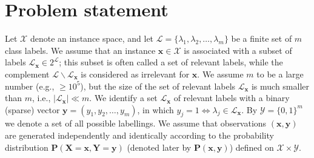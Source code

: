 \documentclass{article}
\renewcommand{\vec}[1]{\boldsymbol{#1}}
\newcommand{\bx}{\vec{x}}
\newcommand{\by}{\vec{y}}
\newcommand{\bX}{\vec{X}}
\newcommand{\bY}{\vec{Y}}
\newcommand{\calX}{\mathcal{X}}
\newcommand{\calY}{\mathcal{Y}}
\newcommand{\calL}{\mathcal{L}}
\newcommand{\prob}{\mathbf{P}}
\newcommand{\sectionBefore}{-0pt}
\newcommand{\sectionAfter}{-0pt}
\begin{document}
{%
%

\vspace{\sectionBefore}
\section{Problem statement}
\label{sec:problem_statement}
\vspace{\sectionAfter}

Let $\calX$ denote an instance space, and let $\calL = \{\lambda_1,\lambda_2, \ldots,\lambda_m\}$ be a finite set of $m$ class labels. 
We assume that an instance $\bx \in \calX$ is associated with a subset of
labels $\calL_{\bx} \in 2^\calL$; this subset is often called a set of relevant labels, while the complement
$\calL \backslash \calL_{\bx}$ is considered as irrelevant for $\bx$. We assume $m$ to be a large number (e.g., $\ge 10^5$), but the size of the set of relevant labels $\calL_{\bx}$ is much smaller than $m$, i.e., $|\calL_{\bx}| \ll m$. We identify a set $\calL_{\bx}$ of relevant labels with a binary (sparse)
vector $\by = (y_1,y_2, \ldots, y_m)$, in which $y_j = 1 \Leftrightarrow \lambda_j \in \calL_{\bx}$. By $\calY = \{0, 1\}^m$ we denote a set of all
possible labellings.
We assume that observations $(\bx, \by)$ are generated independently and identically according to the
probability distribution $\prob(\bX = \bx,\bY = \by)$ (denoted later by $\prob(\bx, \by)$) defined on $\calX \times \calY$. 

}
\end{document}
